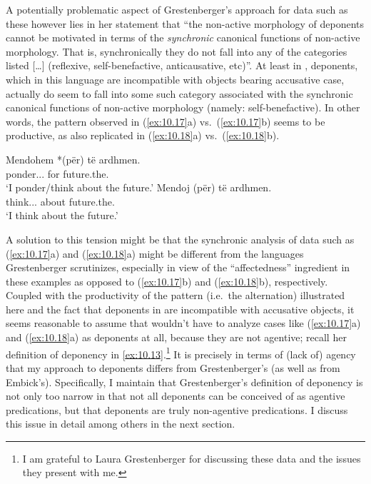 \documentclass[output=paper]{langsci/langscibook}
\begin{document}
A potentially problematic aspect of Grestenberger’s approach for data such as
these however lies in her statement that “the non-active morphology of
deponents cannot be motivated in terms of the \emph{synchronic} canonical
functions of non-active morphology. That is, synchronically they do not fall
into any of the categories listed […] (reflexive, self-benefactive,
anticausative, etc)”. At least in , deponents, which in this language
are incompatible with objects bearing accusative case, actually do seem to fall
into some such category associated with the synchronic canonical functions of
non-active morphology (namely: self-benefactive). In other words, the pattern
observed in (\ref{ex:10.17}a) vs.\ (\ref{ex:10.17}b) seems to be productive, as
also replicated in (\ref{ex:10.18}a) vs.\ (\ref{ex:10.18}b).\newpage

\ea\label{ex:10.18} 
    \ea
    \gll    Mendohem *(për) {të ardhmen}.\\
            ponder.\Fsg.\Prs.\Nact{} \hphantom{*(}for    future.the.\Acc{}\\
    \glt    ‘I ponder/think about the future.’
    \ex
    \gll    Mendoj (për) {të ardhmen}.\\
            think.\Fsg.\Prs.\Act{}  \hphantom{(}about future.the.\Acc{}\\
    \glt    ‘I think about the future.’
    \z
\z

A solution to this tension might be that the synchronic analysis of data such
as (\ref{ex:10.17}a) and (\ref{ex:10.18}a) might be different from the
languages Grestenberger scrutinizes, especially in view of the
\enquote{affectedness} ingredient in these examples as opposed to
(\ref{ex:10.17}b) and (\ref{ex:10.18}b), respectively. Coupled with the
productivity of the pattern (i.e.\ the alternation) illustrated here and the
fact that deponents in  are incompatible with accusative objects, it
seems reasonable to assume that \citet{Grestenberger2018a} wouldn’t have to
analyze cases like (\ref{ex:10.17}a) and (\ref{ex:10.18}a) as deponents
at all, because they are not agentive; recall her definition of deponency in
\eqref{ex:10.13}.\footnote{I am grateful to Laura Grestenberger for
discussing these data and the issues they present with me.} It is precisely in
terms of (lack of) agency that my approach to deponents differs from
Grestenberger’s (as well as from Embick’s). Specifically, I maintain that
Grestenberger’s definition of deponency is not only too narrow in that not all
deponents can be conceived of as agentive predications, but that deponents are
truly non-agentive predications. I discuss this issue in detail among others in
the next section.
\end{document}
